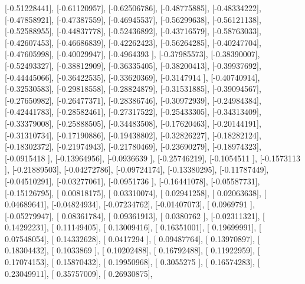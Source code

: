 \documentclass{article}
\begin{document}
       [-0.51228441],
       [-0.61120957],
       [-0.62506786],
       [-0.48775885],
       [-0.48334222],
       [-0.47858921],
       [-0.47387559],
       [-0.46945537],
       [-0.56299638],
       [-0.56121138],
       [-0.52588955],
       [-0.44837778],
       [-0.52436892],
       [-0.43716579],
       [-0.58763033],
       [-0.42607453],
       [-0.46686839],
       [-0.42262423],
       [-0.56264285],
       [-0.40247704],
       [-0.47605998],
       [-0.40029947],
       [-0.4964393 ],
       [-0.37985573],
       [-0.38390007],
       [-0.52493327],
       [-0.38812909],
       [-0.36335405],
       [-0.38200413],
       [-0.39937692],
       [-0.44445066],
       [-0.36422535],
       [-0.33620369],
       [-0.3147914 ],
       [-0.40740914],
       [-0.32530583],
       [-0.29818558],
       [-0.28824879],
       [-0.31531885],
       [-0.39094567],
       [-0.27650982],
       [-0.26477371],
       [-0.28386746],
       [-0.30972939],
       [-0.24984384],
       [-0.42441783],
       [-0.28582461],
       [-0.27317522],
       [-0.25433305],
       [-0.34313409],
       [-0.33379008],
       [-0.25888505],
       [-0.34483508],
       [-0.17620463],
       [-0.20144191],
       [-0.31310734],
       [-0.17190886],
       [-0.19438802],
       [-0.32826227],
       [-0.18282124],
       [-0.18302372],
       [-0.21974943],
       [-0.21780469],
       [-0.23690279],
       [-0.18974323],
       [-0.0915418 ],
       [-0.13964956],
       [-0.0936639 ],
       [-0.25746219],
       [-0.1054511 ],
       [-0.1573113 ],
       [-0.21889503],
       [-0.04272786],
       [-0.09724174],
       [-0.13380295],
       [-0.11787449],
       [-0.04510291],
       [-0.03277061],
       [-0.0951736 ],
       [-0.16441078],
       [-0.05587731],
       [-0.15126795],
       [ 0.00818175],
       [ 0.03310074],
       [ 0.02941258],
       [ 0.02063638],
       [ 0.04689641],
       [-0.04824934],
       [-0.07234762],
       [-0.01407073],
       [ 0.0969791 ],
       [-0.05279947],
       [ 0.08361784],
       [ 0.09361913],
       [ 0.0380762 ],
       [-0.02311321],
       [ 0.14292231],
       [ 0.11149405],
       [ 0.13009416],
       [ 0.16351001],
       [ 0.19699991],
       [ 0.07548054],
       [ 0.14332628],
       [ 0.0417294 ],
       [ 0.09487764],
       [ 0.13970897],
       [ 0.18304432],
       [ 0.1033869 ],
       [ 0.10202488],
       [ 0.16792488],
       [ 0.11922959],
       [ 0.17074153],
       [ 0.15870432],
       [ 0.19950968],
       [ 0.3055275 ],
       [ 0.16574283],
       [ 0.23049911],
       [ 0.35757009],
       [ 0.26930875],
\end{document}
